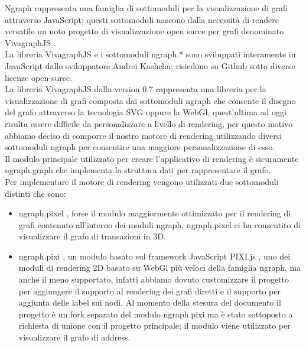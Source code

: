 Ngraph \cite{vis:ngraph} rappresenta una famiglia di sottomoduli per la visualizzazione di grafi attraverso JavaScript; questi sottomoduli nascono dalla necessità di rendere versatile un noto progetto di visualizzazione open surce per grafi denominato VivagraphJS \cite{vis:vivagraphjs}.\\
La libreria VivagraphJS e i sottomoduli ngraph.* sono sviluppati interamente in JavaScript dallo sviluppatore Andrei Kashcha; risiedono su Github sotto diverse licenze open-surce.\\
La libreria VivagraphJS dalla version 0.7 rappresenta una libreria per la visualizzazione di grafi composta dai sottomoduli ngraph che consente il disegno del grafo attraverso la tecnologia SVG oppure la WebGl, quest'ultima ad oggi risulta essere difficile da personalizzare a livello di rendering, per questo motivo abbiamo deciso di comporre il nostro motore di rendering utilizzando diversi sottomoduli ngraph per consentire una maggiore personalizzazione di esso.\\
Il modulo principale utilizzato per creare l'applicativo di rendering è sicuramente ngraph.graph \cite{vis:ngraph.graph} che implementa la struttura dati per rappresentare il grafo.\\
Per implementare il motore di rendering vengono utilizzati due sottomoduli distinti che sono:
\begin{itemize}
  \item ngraph.pixel \cite{vis:ngraph.pexel}, forse il modulo maggiormente ottimizzato per il rendering di grafi contenuto all'interno dei moduli ngraph, ngraph.pixel ci ha consentito di visualizzare il grafo di transazioni in 3D.
  \item ngraph.pixi \cite{vis:ngraph.pixi}, un modulo basato sul framework JavaScript PIXI.js \cite{vis:pixijs}, uno dei moduli di rendering 2D basato su WebGl più veloci della famiglia ngraph, ma anche il meno supportato, infatti abbiamo dovuto customizzare il progetto per aggiungere il supporto al rendering dei grafi diretti e il supporto per aggiunta delle label sui nodi. Al momento della stesura del documento il progetto è un fork separato del modulo ngraph.pixi ma è stato sottoposto a richiesta di unione con il progetto principale; il modulo viene utilizzato per visualizzare il grafo di address.
\end{itemize}

